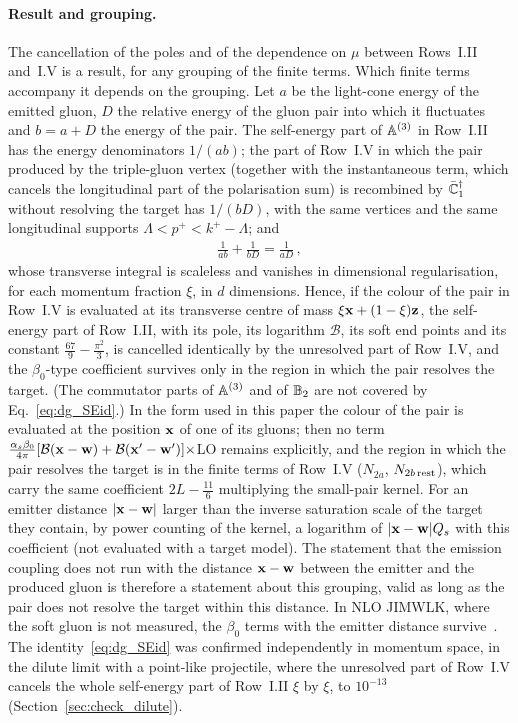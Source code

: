 \paragraph{Result and grouping.} The cancellation of the poles and of the dependence on $\mu$ between Rows~I.II and~I.V is a result, for any grouping of the finite terms. Which finite terms accompany it depends on the grouping. Let $a$ be the light-cone energy of the emitted gluon, $D$ the relative energy of the gluon pair into which it fluctuates and $b=a+D$ the energy of the pair. The self-energy part of $\mathbb{A}^{(3)}$ in Row~I.II has the energy denominators $1/(ab)$; the part of Row~I.V in which the pair produced by the triple-gluon vertex (together with the instantaneous term, which cancels the longitudinal part of the polarisation sum) is recombined by $\bar{\mathbb{C}}_1^\dagger$ without resolving the target has $1/(bD)$, with the same vertices and the same longitudinal supports $\Lambda<p^+<k^+-\Lambda$; and
\begin{align}\label{eq:dg_SEid}
\frac{1}{ab}+\frac{1}{bD}=\frac{1}{aD}\,,
\end{align}
whose transverse integral is scaleless and vanishes in dimensional regularisation, for each momentum fraction $\xi$, in $d$ dimensions. Hence, if the colour of the pair in Row~I.V is evaluated at its transverse centre of mass $\xi\mathbf{x}+(1-\xi)\mathbf{z}$, the self-energy part of Row~I.II, with its pole, its logarithm $\mathcal B$, its soft end points and its constant $\frac{67}{9}-\frac{\pi^2}{3}$, is cancelled identically by the unresolved part of Row~I.V, and the $\beta_0$-type coefficient survives only in the region in which the pair resolves the target. (The commutator parts of $\mathbb{A}^{(3)}$ and of $\mathbb{B}_2$ are not covered by Eq.~\eqref{eq:dg_SEid}.) In the form used in this paper the colour of the pair is evaluated at the position $\mathbf{x}$ of one of its gluons; then no term $\frac{\alpha_s\beta_0}{4\pi}[\mathcal B(\mathbf{x}-\mathbf{w})+\mathcal B(\mathbf{x}'-\mathbf{w}')]\times$LO remains explicitly, and the region in which the pair resolves the target is in the finite terms of Row~I.V ($N_{2a}$, $N_{2b\,\rm rest}$), which carry the same coefficient $2L-\frac{11}{6}$ multiplying the small-pair kernel. For an emitter distance $|\mathbf{x}-\mathbf{w}|$ larger than the inverse saturation scale of the target they contain, by power counting of the kernel, a logarithm of $|\mathbf{x}-\mathbf{w}|Q_s$ with this coefficient (not evaluated with a target model). The statement that the emission coupling does not run with the distance $\mathbf{x}-\mathbf{w}$ between the emitter and the produced gluon is therefore a statement about this grouping, valid as long as the pair does not resolve the target within this distance. In NLO JIMWLK, where the soft gluon is not measured, the $\beta_0$ terms with the emitter distance survive~\cite{Kovner:2023vsy}. The identity~\eqref{eq:dg_SEid} was confirmed independently in momentum space, in the dilute limit with a point-like projectile, where the unresolved part of Row~I.V cancels the whole self-energy part of Row~I.II $\xi$ by $\xi$, to $10^{-13}$ (Section~\ref{sec:check_dilute}).

